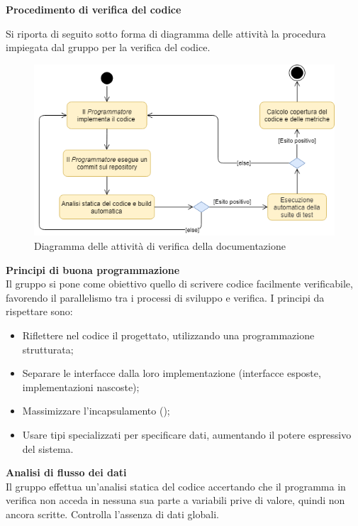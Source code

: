 \textbf{Procedimento di verifica del codice}

Si riporta di seguito sotto forma di diagramma delle attività la procedura impiegata dal gruppo \Gruppo{} per la verifica del codice.


\begin{figure}[!htb]
     \centering
     \includegraphics[scale=0.7]{Images/verCode.png}
     \caption{Diagramma delle attività di verifica della documentazione}
\end{figure}


\textbf{Principi di buona programmazione}\\
Il gruppo si pone come obiettivo quello di scrivere codice facilmente verificabile, favorendo il parallelismo tra i processi di sviluppo e verifica. I principi da rispettare sono:
\begin{itemize}
	\item Riflettere nel codice il  progettato, utilizzando una programmazione strutturata;
	\item Separare le interfacce dalla loro implementazione (interfacce esposte, implementazioni nascoste);
	\item Massimizzare l'incapsulamento ();
	\item Usare tipi specializzati per specificare dati, aumentando il potere espressivo del sistema. 
\end{itemize}

\mbox{}

\textbf{Analisi di flusso dei dati} \\
Il gruppo effettua un'analisi statica del codice accertando che il programma in verifica non acceda in nessuna sua parte a variabili prive di valore, quindi non ancora scritte. Controlla l'assenza di dati globali.\\


